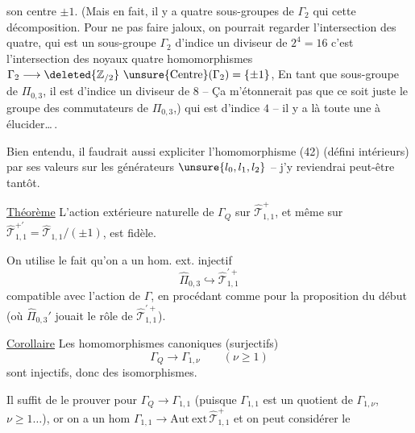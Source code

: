 son centre $\pm1$. (Mais en fait, il y a  quatre sous-groupes de $\Gamma_2$ qui  cette décomposition. Pour ne pas faire  jaloux, on pourrait regarder l'intersection des quatre, qui est un sous-groupe $\Gamma_2$ d'indice un diviseur de $2^4=16$ c'est l'intersection des noyaux  quatre homomorphismes $\Gamma_2\longrightarrow\deleted{\mathbb Z_{/2}}\ \unsure{\mathrm{Centre}}(\Gamma_2)=\{\pm1\}$,
En tant que sous-groupe de $\Pi_{0,3}$, il est d'indice un diviseur de $8$ -- Ça m'étonnerait pas que ce soit juste le groupe des commutateurs de $\Pi_{0,3}$,) qui est d'indice $4$ -- il y a là toute une  à élucider\ldots\,.

Bien entendu, il faudrait aussi expliciter l'homomorphisme (42) (défini   intérieurs) par ses valeurs sur les générateurs $\unsure{l_0,l_1,l_2}$ -- j'y reviendrai peut-être tantôt.


\uline{Théorème} L'action extérieure naturelle de $\Gamma_Q$ sur $\widehat{\mathcal T}_{1,1}^{+}$, et même sur $\widehat{\mathcal T}_{1,1}^{+\prime}=\widehat{\mathcal T}_{1,1}/(\pm1)$, est fidèle.

On utilise le fait qu'on a un hom. ext. injectif
\[
\widehat{\Pi}_{0,3}\hookrightarrow\widehat{\mathcal T}_{1,1}^{\prime+}
\]
compatible avec l'action de $\Gamma$, en procédant comme pour la proposition du début (où $\widehat{\Pi}_{0,3}'$ jouait le rôle de $\widehat{\mathcal T}_{1,1}^{\prime+}$).

\uline{Corollaire} Les homomorphismes canoniques (surjectifs)
\[
\tag{43}
\Gamma_Q\longrightarrow\Gamma_{1,\nu}\qquad(\nu\geq1)
\]
sont injectifs, donc des isomorphismes.

Il suffit de le prouver pour $\Gamma_Q\longrightarrow\Gamma_{1,1}$ (puisque $\Gamma_{1,1}$ est un quotient de $\Gamma_{1,\nu}$, $\nu\geq1\ldots$), or on a un hom  $\Gamma_{1,1}\longrightarrow\mathrm{Aut\ ext}\,\widehat{\mathcal T}_{1,1}^{+}$ et on peut considérer le 
